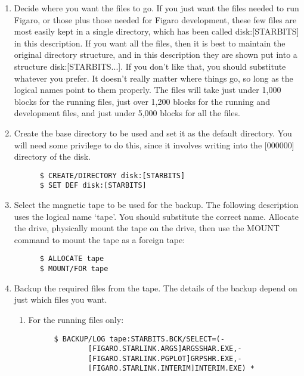 \begin{enumerate}

\item Decide where you want the files to go. If you just want the files  needed
to run Figaro, or those plus those needed for Figaro development, these few
files are most easily kept in a single directory, which has been called
disk:[STARBITS] in this description. If you want all the files, then it is best
to maintain the original directory structure, and in this description they are
shown put into a structure disk:[STARBITS...]. If you don't like that, you
should substitute whatever you prefer. It doesn't really matter where things
go, so long as the logical names point to them properly. The files will take
just under  1,000 blocks for the running files, just over 1,200 blocks for the
running and development files, and just under 5,000 blocks for all the files.

\item Create the base directory to be used and set it as the default directory.
You will need some privilege to do this, since it involves writing into the
[000000] directory of the disk.

\begin{verbatim}
      $ CREATE/DIRECTORY disk:[STARBITS]
      $ SET DEF disk:[STARBITS]
\end{verbatim}

\item Select the magnetic tape to be used for the backup. The following 
description uses the logical name `tape'. You should substitute the  correct
name. Allocate the drive, physically mount the tape on the drive, then use the
MOUNT command to mount the tape as a foreign tape:

\begin{verbatim}
      $ ALLOCATE tape
      $ MOUNT/FOR tape
\end{verbatim}

\item Backup the required files from the tape. The details of the backup
depend on just which files you want.

\begin{enumerate}

\item For the running files only:

\begin{verbatim}
      $ BACKUP/LOG tape:STARBITS.BCK/SELECT=(-
              [FIGARO.STARLINK.ARGS]ARGSSHAR.EXE,-
              [FIGARO.STARLINK.PGPLOT]GRPSHR.EXE,-
              [FIGARO.STARLINK.INTERIM]INTERIM.EXE) *
\end{verbatim}


\end{enumerate}
\end{enumerate}
